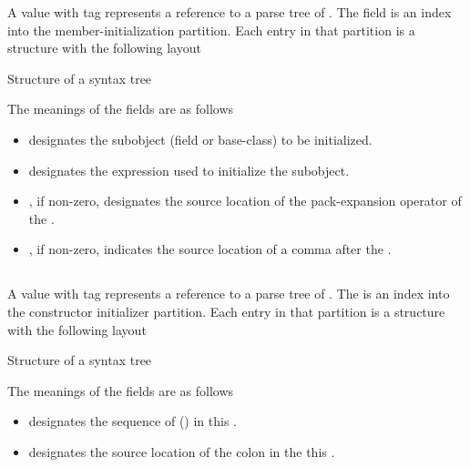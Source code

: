 A  value with tag  represents a reference
to a parse tree of .  The  field is an index into the
member-initialization partition.  Each entry in that partition is a structure with the following layout
%
\begin{Structure}
	\caption{Structure of a  syntax tree}
	\label{fig:ifc:SyntaxSort:MemInitializer}
\end{Structure}
%
The meanings of the fields are as follows
\begin{itemize}
	\item {} designates the subobject (field or base-class) to be initialized.
	\item {} designates the expression used to initialize the subobject.
	\item {}, if non-zero, designates the source location of the pack-expansion 
	operator of the .
	\item {}, if non-zero, indicates the source location of a comma after the .
\end{itemize}



\subsection{}
\label{sec:ifc:SyntaxSort:CtorInitializer}

A  value with tag  represents a reference
to a parse tree of .  The  is an index into the constructor initializer
partition. Each entry in that partition is a structure with the following layout
%
\begin{Structure}
	\caption{Structure of a  syntax tree}
	\label{fig:ifc:SyntaxSort:CtorInitializer}
\end{Structure}
%
The meanings of the fields are as follows
\begin{itemize}
	\item {} designates the sequence of 
	() in this .
	\item {} designates the source location of the colon in the this .
\end{itemize} 

